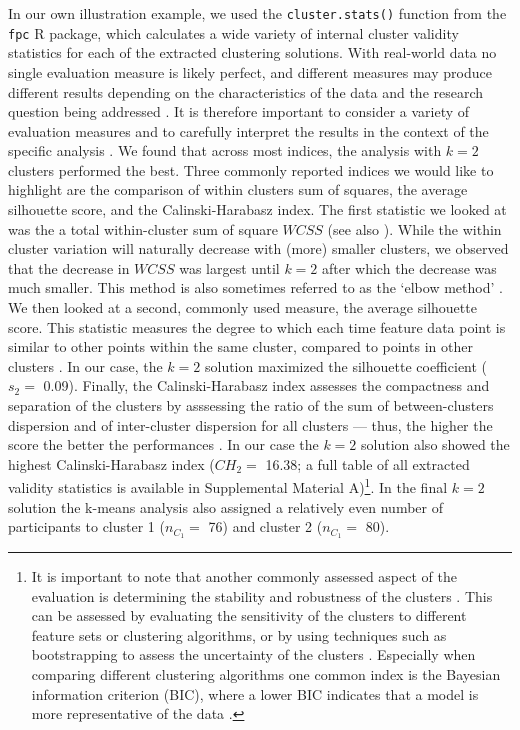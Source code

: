 In our own illustration example, we used the \texttt{cluster.stats()}
function from the \texttt{fpc} \textsf{R} package, which calculates a
wide variety of internal cluster validity statistics for each of the
extracted clustering solutions. With real-world data no single
evaluation measure is likely perfect, and different measures may produce
different results depending on the characteristics of the data and the
research question being addressed \citep{kittler1998}. It is therefore
important to consider a variety of evaluation measures and to carefully
interpret the results in the context of the specific analysis
\citep{vinh2009}. We found that across most indices, the analysis with
\(k=2\) clusters performed the best. Three commonly reported indices we
would like to highlight are the comparison of within clusters sum of
squares, the average silhouette score, and the Calinski-Harabasz index.
The first statistic we looked at was the a total within-cluster sum of
square \(WCSS\) (see also ). While the within cluster
variation will naturally decrease with (more) smaller clusters, we
observed that the decrease in \(WCSS\) was largest until \(k=2\) after
which the decrease was much smaller. This method is also sometimes
referred to as the `elbow method' \citep{syakur2018}. We then looked at
a second, commonly used measure, the average silhouette score. This
statistic measures the degree to which each time feature data point is
similar to other points within the same cluster, compared to points in
other clusters \citep{rousseeuw1987}. In our case, the \(k=2\) solution
maximized the silhouette coefficient (\(s_2=\) 0.09). Finally, the
Calinski-Harabasz index assesses the compactness and separation of the
clusters by asssessing the ratio of the sum of between-clusters
dispersion and of inter-cluster dispersion for all clusters --- thus,
the higher the score the better the performances \citep{calinski1974}.
In our case the \(k=2\) solution also showed the highest
Calinski-Harabasz index (\(CH_2=\) 16.38; a full table of all extracted
validity statistics is available in Supplemental Material
A)\footnote{It is important to note that another commonly assessed aspect of the evaluation is determining the stability and robustness of the clusters \citep{berkhin2006}. This can be assessed by evaluating the sensitivity of the clusters to different feature sets or clustering algorithms, or by using techniques such as bootstrapping to assess the uncertainty of the clusters \citep{vinh2009}. Especially when comparing different clustering algorithms one common index is the Bayesian information criterion (BIC), where a lower BIC indicates that a model is more representative of the data \citep{vandeschoot2017}.}.
In the final \(k=2\) solution the k-means analysis also assigned a
relatively even number of participants to cluster 1 (\(n_{C_1}=\) 76)
and cluster 2 (\(n_{C_1}=\) 80).
